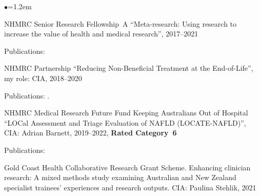 \documentclass[a4paper,11pt]{article}
\renewcommand{\labelitemi}{$\bullet$}
\begin{document}
\begin{raggedright}
\begin{list}{\labelitemi}{\leftmargin=1.2em}
\item NHMRC Senior Research Fellowship~A ``Meta-research: Using research to increase the value of health and medical research'', 2017--2021

   Publications: 


\item NHMRC Partnership ``Reducing Non-Beneficial Treatment at the End-of-Life'', my role: CIA, 2018--2020

Publications: .

\item NHMRC Medical Research Future Fund Keeping Australians Out of Hospital ``LOCal Assessment and Triage Evaluation of NAFLD (LOCATE-NAFLD)'', CIA: Adrian Barnett, 2019--2022, \textbf{Rated Category~6}

Publications: 




\item Gold Coast Health Collaborative Research Grant Scheme. Enhancing clinician research: A mixed methods study examining Australian and New Zealand specialist trainees' experiences and research outputs. CIA: Paulina Stehlik, 2021 


\end{list}
\end{raggedright}
\end{document}
